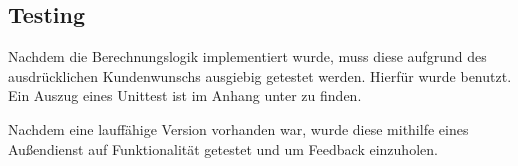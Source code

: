 \subsection{Testing}

Nachdem die Berechnungslogik implementiert wurde, muss diese aufgrund des ausdrücklichen Kundenwunschs ausgiebig getestet werden. Hierfür wurde  benutzt. Ein Auszug eines Unittest ist im Anhang unter  zu finden.

Nachdem eine lauffähige Version vorhanden war, wurde diese mithilfe eines Außendienst  auf Funktionalität getestet und um Feedback einzuholen.
